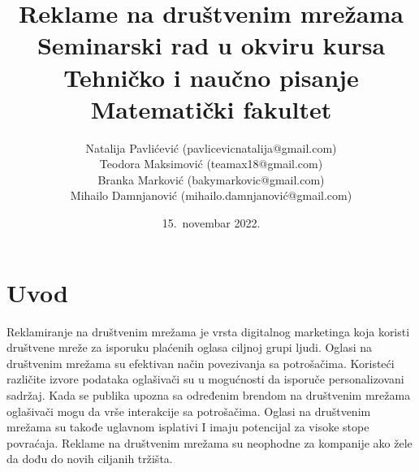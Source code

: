 \documentclass[a4paper]{article}
\title{Reklame na društvenim mrežama\\ \small{Seminarski rad u okviru kursa\\Tehničko i naučno pisanje\\ Matematički fakultet}}
\author{Natalija Pavlićević (pavlicevicnatalija@gmail.com)\\ Teodora Maksimović (teamax18@gmail.com)\\ Branka Marković (bakymarkovic@gmail.com)\\ Mihailo Damnjanović (mihailo.damnjanović@gmail.com)}
\date{15.~novembar 2022.}
\begin{document}
	\renewcommand{\abstractname}{Apstrakt}
	\renewcommand{\contentsname}{Sadržaj}
	\tableofcontents
	
	\newpage
	
	\section{Uvod}
	\label{sec:uvod}
	Reklamiranje na društvenim mrežama je vrsta digitalnog marketinga koja koristi društvene mreže za isporuku plaćenih oglasa ciljnoj grupi ljudi. Oglasi na društvenim mrežama su efektivan način povezivanja sa potrošačima. Koristeći različite izvore podataka oglašivači su u mogućnosti da isporuče personalizovani sadržaj. Kada se publika upozna sa određenim brendom na društvenim mrežama oglašivači mogu da vrše interakcije sa potrošačima. Oglasi na društvenim mrežama su takođe uglavnom isplativi I imaju potencijal za visoke stope povraćaja. Reklame na društvenim mrežama su neophodne za kompanije ako žele da dođu do novih ciljanih tržišta. 
	
\end{document}
